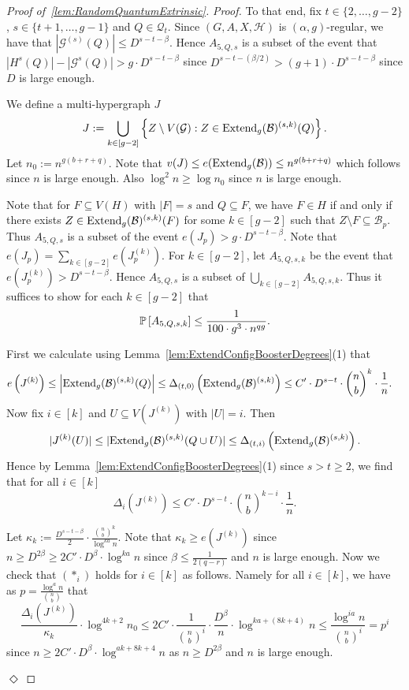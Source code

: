 \documentclass[11pt]{article}
\newcommand{\mc}[1]{\mathcal{#1}}
\newcounter{i}
\theoremstyle{plain}
\newenvironment{proofclaim}[1][]%
{\noindent \emph{Proof.} {}{#1}{}}{\hfill
	$\Diamond$\vspace{1em}}
\renewcommand{\theclaim}{\thetheorem.\arabic{claim}}
\newenvironment{lateproof}[1]
 {%
  \renewcommand{\theclaim}{\ref{#1}.\arabic{claim}}%
  \begin{proof}[Proof of~\cref{#1}]%
 }
 {\end{proof}}
\theoremstyle{plain} %
\theoremstyle{definition}
\newcommand{\Prob}[1]{\ensuremath{%
\mathbb P\left[#1\right]
}}
\begin{document}
\begin{lateproof}{lem:RandomQuantumExtrinsic}
\begin{proofclaim}
To that end, fix $t \in \{2,\ldots, g-2\}$, $s\in \{t+1,\ldots, g-1\}$ and $Q\in \mc{Q}_t$. Since $(G,A,X,\mc{H})$ is $(\alpha,g)$-regular, we have that  $|\mc{G}^{(s)}(Q)| \le D^{s-t-\beta}$. Hence $A_{5,Q,s}$ is a subset of the event that $|H^{s}(Q)| - |\mc{G}^{s}(Q)| > g\cdot D^{s-t-\beta}$ since $D^{s-t-(\beta/2)} > (g+1)\cdot D^{s-t-\beta}$ since $D$ is large enough. 

We define a multi-hypergraph $J$ 
$$J:= \bigcup_{k\in [g-2]} \left\{ Z\setminus V(\mc{G}): Z\in{\rm Extend}_g(\mc{B})^{(s,k)}(Q)\right\}.$$
Let $n_0:= n^{g(b+r+q)}$. Note that $v(J) \le e({\rm Extend}_g(\mc{B})) \le n^{g(b+r+q)}$ which follows since $n$ is large enough. Also $\log^2 n\ge \log n_0$ since $n$ is large enough.

Note that for $F\subseteq V(H)$ with $|F|=s$ and $Q\subseteq F$, we have $F\in H$ if and only if there exists $Z\in{\rm Extend}_g(\mc{B})^{(s,k)}(F)$ for some $k\in [g-2]$ such that $Z\setminus F\subseteq \mc{B}_p$. Thus $A_{5,Q,s}$ is a subset of the event $e(J_p) > g\cdot D^{s-t-\beta}$.
Note that $e(J_p) = \sum_{k\in [g-2]} e\left(J^{(k)}_p\right)$. For $k\in [g-2]$, let $A_{5,Q,s,k}$ be the event that $e\left(J^{(k)}_p\right) > D^{s-t-\beta}$. Hence $A_{5,Q,s}$ is a subset of $\bigcup_{k \in [g-2]} A_{5,Q,s,k}$. Thus it suffices to show for each  $k\in [g-2]$ that
$$\Prob{A_{5,Q,s,k}} \le \frac{1}{100\cdot g^3 \cdot n^{qg}}.$$

First we calculate using Lemma~\ref{lem:ExtendConfigBoosterDegrees}(1) that
\begin{align*}
e\left(J^{(k)}\right) &\le \left|{\rm Extend}_g(\mc{B})^{(s,k)}(Q)\right|\le \Delta_{(t,0)}\left({\rm Extend}_g(\mc{B})^{(s,k)}\right) \le C'\cdot D^{s-t}\cdot \binom{n}{b}^{k}\cdot \frac{1}{n}.
\end{align*}
Now fix $i\in [k]$ and $U\subseteq V(J^{(k)})$ with $|U|=i$. Then
$$|J^{(k)}(U)| \le |{\rm Extend}_g(\mc{B})^{(s,k)}(Q\cup U)| \le \Delta_{(t,i)}\left({\rm Extend}_g(\mc{B})^{(s,k)}\right).$$
Hence by Lemma~\ref{lem:ExtendConfigBoosterDegrees}(1) since $s > t\ge 2$, we find that for all $i\in [k]$
$$\Delta_i\left(J^{(k)}\right) \le C'\cdot D^{s-t}\cdot \binom{n}{b}^{k-i}\cdot \frac{1}{n}.$$

Let $\kappa_k:= \frac{D^{s-t-\beta}}{2} \cdot \frac{\binom{n}{b}^k}{\log^{ka} n}$. Note that $\kappa_k\ge e\left(J^{(k)}\right)$ since $n \ge D^{2\beta} \ge 2C'\cdot D^{\beta} \cdot \log^{ka} n$ since $\beta \le \frac{1}{2(q-r)}$ and $n$ is large enough. Now we check that $(*_i)$ holds for $i\in [k]$ as follows. Namely for all $i\in [k]$, we have as $p=\frac{\log^a n}{\binom{n}{b}}$ that
$$\frac{\Delta_i\left(J^{(k)}\right)}{\kappa_k}\cdot \log^{4k+2}n_0\le 2C'\cdot \frac{1}{\binom{n}{b}^i}\cdot \frac{D^{\beta}}{n} \cdot \log^{ka+(8k+4)}n \le \frac{\log^{ia} n}{\binom{n}{b}^i} = p^i$$ since $n \ge 2C'\cdot D^{\beta} \cdot \log^{ak+8k+4} n$ as $n\ge D^{2\beta}$ and $n$ is large enough. 


\end{proofclaim}
\end{lateproof}
\end{document}
